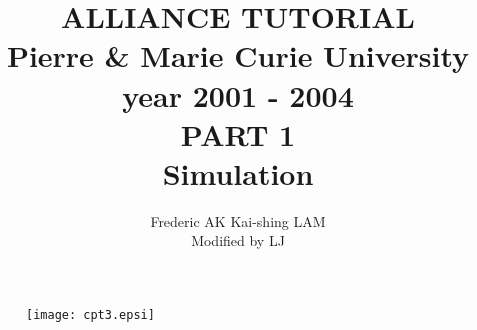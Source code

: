 \documentclass[12pt]{article}
\begin{document}
\title{
                    {\Huge ALLIANCE TUTORIAL\\}
	 {\large
               Pierre \& Marie Curie University \\
                    year 2001 - 2004\\
    }
    \vspace{1cm}
    {\huge
                      PART 1\\
                Simulation
    }
}
\date{}
      
\author{Frederic AK \hspace{2cm}  Kai-shing LAM\\
Modified by LJ
}

\maketitle

\begin{figure}[H]\centering
  \texttt{[image: cpt3.epsi]}
\end{figure}

\begin{figure}
\end{figure}

\thispagestyle{empty}
\def\myfbox#1{\vspace*{3mm}\fbox{#1}\vspace{3mm}}

        \vspace{3cm}
\end{document}
